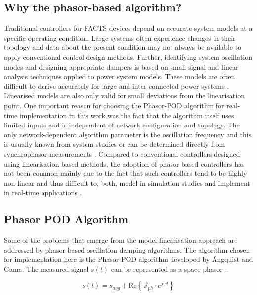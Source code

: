 \documentclass{ieeeaccess}
\begin{document}
\subsection{Why the phasor-based algorithm?} 
Traditional controllers for FACTS devices depend on accurate system models at a specific operating condition. Large systems often experience changes in their topology and data about the present condition may not always be available to apply conventional control design methods. Further, identifying system oscillation modes and designing appropriate dampers is based on small signal and linear analysis techniques applied to power system models. These models are often difficult to derive accurately for large and inter-connected power systems \cite{WAMTCSC}. Linearised models are also only valid for small deviations from the linearisation point. One important reason for choosing the Phasor-POD algorithm for real-time implementation in this work was the fact that the algorithm itself uses limited inputs and is independent of network configuration and topology. The only network-dependent algorithm parameter is the oscillation frequency and this is usually known from system studies or can be determined directly from synchrophasor measurements \cite{TaskForce}. Compared to conventional controllers designed using linearisation-based methods, the adoption of phasor-based controllers has not been common mainly due to the fact that such controllers tend to be highly non-linear and thus difficult to, both, model in simulation studies \cite{Chaudhuri} and implement in real-time applications \cite{WAPODNorway}.

\subsection{Phasor POD Algorithm}

Some of the problems that emerge from the model linearisation approach are addressed by phasor-based oscillation damping algorithms. The algorithm chosen for implementation here is the Phasor-POD algorithm developed by \"{A}ngquist and Gama\cite{PhasorPOD}. The measured signal $s(t)$ can be represented as a space-phasor \cite{Chaudhuri}: 

\begin{equation}
s(t)={s}_{avg}+\mathrm{Re}\left\{{\stackrel{\to }{s}}_{ph}\cdot {e}^{{jwt}}\right\}
\end{equation}
\end{document}
